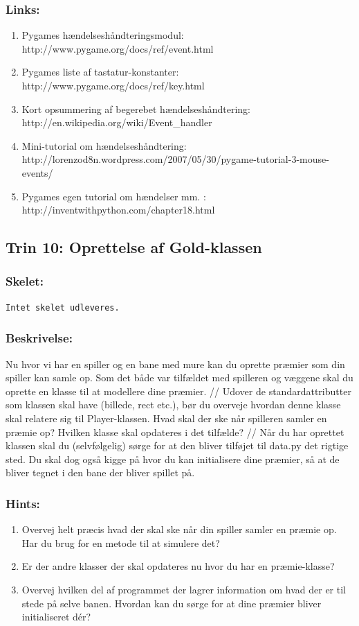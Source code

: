 \documentclass[10pt,a4paper,danish]{article}
\begin{document}
\subsubsection{Links:}
\begin{enumerate}
\item Pygames hændelseshåndteringsmodul: http://www.pygame.org/docs/ref/event.html
\item Pygames liste af tastatur-konstanter: http://www.pygame.org/docs/ref/key.html
\item Kort opsummering af begerebet hændelseshåndtering: http://en.wikipedia.org/wiki/Event\_handler
\item Mini-tutorial om hændelseshåndtering: http://lorenzod8n.wordpress.com/2007/05/30/pygame-tutorial-3-mouse-events/
\item Pygames egen tutorial om hændelser mm. : http://inventwithpython.com/chapter18.html
\end{enumerate}

\subsection{Trin 10: Oprettelse af Gold-klassen}
\subsubsection{Skelet:} 
\begin{verbatim}
Intet skelet udleveres. 
\end{verbatim}
\subsubsection{Beskrivelse:}
Nu hvor vi har en spiller og en bane med mure kan du 
oprette præmier som din spiller kan samle op. Som det 
både var tilfældet med spilleren og væggene skal du
oprette en klasse til at modellere dine præmier. 
//
Udover de standardattributter som klassen skal have
(billede, rect etc.), bør du overveje hvordan denne 
klasse skal relatere sig til Player-klassen. Hvad skal 
der ske når spilleren samler en præmie op? Hvilken 
klasse skal opdateres i det tilfælde?
//
Når du har oprettet klassen skal du (selvfølgelig)
sørge for at den bliver tilføjet til data.py det
rigtige sted. Du skal dog også kigge på hvor du
kan initialisere dine præmier, så at de bliver
tegnet i den bane der bliver spillet på.  

\subsubsection{Hints:}
\begin{enumerate}
\item Overvej helt præcis hvad der skal ske
når din spiller samler en præmie op. Har du
brug for en metode til at simulere det?
\item Er der andre klasser der skal opdateres
nu hvor du har en præmie-klasse?
\item Overvej hvilken del af programmet der 
lagrer information om hvad der er til stede 
på selve banen. Hvordan kan du sørge for at
dine præmier bliver initialiseret dér?
\end{enumerate}
\end{document}
